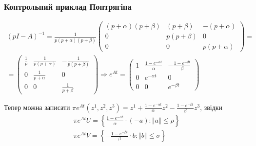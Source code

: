 \documentclass[10pt,pdf,aspectratio=169]{beamer}
\renewcommand{\l}{\left}
\renewcommand{\r}{\right}
\newcommand{\norm}[1]{\left\Vert #1 \right\Vert}
\begin{document}
    \begin{frame}
        \frametitle{Контрольний приклад Понтрягіна}

        \begin{gather*}
            (pI - A)^{-1} = \frac{1}{p(p+\alpha)(p+\beta)}\begin{pmatrix}
                (p+\alpha)(p+\beta) & (p+\beta) & -(p+\alpha) \\
                0 & p(p+\beta) & 0 \\
                0 & 0 & p(p+\alpha)
            \end{pmatrix} = \\ =
            \begin{pmatrix}
                \frac{1}{p} & \frac{1}{p(p+\alpha)} & - \frac{1}{p(p+\beta)} \\
                0 & \frac{1}{p+\alpha} & 0 \\
                0 & 0 & \frac{1}{p+\beta}
            \end{pmatrix} \Rightarrow
            e^{At} = \begin{pmatrix}
                1 & \frac{1 - e^{-\alpha t}}{\alpha} & -\frac{1 - e^{-\beta t}}{\beta} \\
                0 & e^{-\alpha t} & 0 \\
                0 & 0 & e^{-\beta t}
            \end{pmatrix}
        \end{gather*}   

        Тепер можна записати $\pi e^{At}(z^1, z^2, z^3) = z^1 + \frac{1 - e^{-\alpha t}}{\alpha} z^2 - \frac{1 - e^{-\beta t}}{\beta}z^3$, звідки
        \begin{gather*}
            \pi e^{At} U = \l\{\frac{1 - e^{-\alpha t}}{\alpha} \cdot (-a) : \norm{a} \leq \rho\r\} \\ 
            \pi e^{At} V = \l\{-\frac{1 - e^{-\beta t}}{\beta} \cdot b : \norm{b} \leq \sigma\r\}
        \end{gather*}
    \end{frame}
\end{document}
